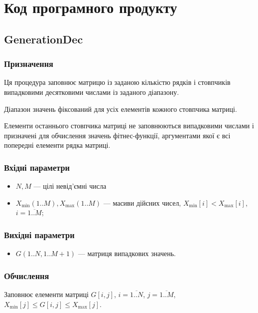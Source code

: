 \documentclass[a4paper, 12pt]{article}
\numberwithin{equation}{section}
\begin{document}
\section{Код програмного продукту}

\subsection{GenerationDec}

\subsubsection*{Призначення}

Ця процедура заповнює матрицю із заданою кількістю рядків і стовпчиків випадковими десятковими числами із заданого діапазону. \medskip

Діапазон значень фіксований для усіх елементів кожного стовпчика матриці. \medskip

Елементи останнього стовпчика матриці не заповнюються випадковими числами і призначені для обчислення значень фітнес-функції, аргументами якої є всі попередні елементи рядка матриці.

\subsubsection*{Вхідні параметри}

\begin{itemize}
    \item $N, M$ --- цілі невід'ємні числа
    \item $X_{\text{min}}(1..M), X_{\text{max}}(1..M)$ --- масиви дійсних чисел, $X_{\text{min}}[i] < X_{\text{max}}[i]$, $i = \overline{1..M}$;
\end{itemize}

\subsubsection*{Вихідні параметри}

\begin{itemize}
    \item $G(1..N, 1..M+1)$ --- матриця випадкових значень.
\end{itemize}

\subsubsection*{Обчислення}

Заповнює елементи матриці $G[i,j]$, $i = \overline{1..N}$, $j = \overline{1..M}$, $X_{\text{min}}[j] \le G[i, j] \le X_{\text{max}}[j]$.
\end{document}
